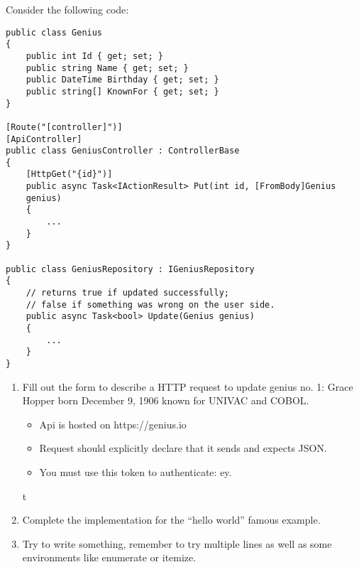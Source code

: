 



\pgfmathsetmacro{}

Consider the following code:

\begin{lstlisting}
public class Genius
{
	public int Id { get; set; }
	public string Name { get; set; }
	public DateTime Birthday { get; set; }
	public string[] KnownFor { get; set; }
}

[Route("[controller]")]
[ApiController]
public class GeniusController : ControllerBase
{
	[HttpGet("{id}")]
	public async Task<IActionResult> Put(int id, [FromBody]Genius
	genius)
	{
		...
	}
}

public class GeniusRepository : IGeniusRepository
{
	// returns true if updated successfully;
	// false if something was wrong on the user side.
	public async Task<bool> Update(Genius genius)
	{
		...
	}
}
\end{lstlisting}

\begin{enumerate}[a]
    \item {} Fill out the form to describe a HTTP request to update genius no. 1:
Grace Hopper born December 9, 1906 known for UNIVAC and COBOL.
        \begin{itemize}
			\item Api is hosted on https://genius.io
			\item Request should explicitly declare that it sends and expects JSON.
			\item You must use this token to authenticate: ey.  
		\end{itemize}t
		\ifdefined\questionOneAnswerA
		  \newline\answer\questionOneAnswerA
		\else
		  \\
		\fi

    \item {} Complete the implementation for the ``hello world'' famous example. 
		

    \item {} Try to write something, remember to try multiple lines as well as some environments like enumerate or itemize.  
		\ifdefined\questionOneAnswerC
		  \newline\answer\questionOneAnswerC
		\else
		  \\
		\fi

\end{enumerate}
